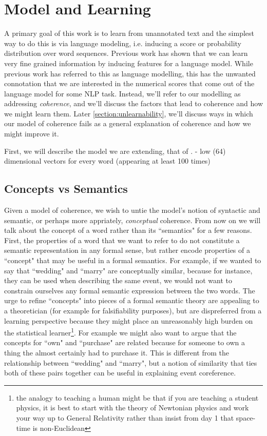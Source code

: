 \documentclass[11pt,letterpaper]{article}
\begin{document}
\section{Model and Learning} %
A primary goal of this work is to learn from unannotated text and
the simplest way to do this is via language modeling, i.e. inducing
a score or probability distribution over word sequences.
Previous work has shown that we can learn very fine grained information
by inducing features for a language model.
While previous work has referred to this as language modelling,
this has the unwanted connotation that we are interested in the
numerical scores that come out of the language model for some NLP task.
Instead, we'll refer to our modelling as addressing {\em coherence},
and we'll discuss the factors that lead to coherence and how we might learn them. 
Later \ref{section:unlearnability}, we'll discuss ways in which our model of coherence
fails as a general explanation of coherence and how we might improve it.

First, we will describe the model we are extending, that of \cite{rami}.
- low (64) dimensional vectors for every word (appearing at least 100 times)

\subsection{Concepts vs Semantics}
Given a model of coherence, we wish to untie the model's notion of syntactic
and semantic, or perhaps more appriately, {\em conceptual} coherence.
From now on we will talk about the concept of a word rather than its ``semantics"
for a few reasons. First, the properties of a word that we want to refer to do
not constitute a semantic representation in any formal sense, but rather encode
properties of a ``concept" that may be useful in a formal semantics.
For example, if we wanted to say that ``wedding" and ``marry" are conceptually
similar, because for instance, they can be used when describing the same event,
we would not want to constrain ourselves any formal semantic expression between
the two words. The urge to refine ``concepts" into pieces of a formal semantic theory
are appealing to a theoretician (for example for falsifiability purposes), but are
dispreferred from a learning perspective because they might place an unreasonably high
burden on the statistical learner\footnote{the analogy to teaching a human might be that
if you are teaching a student physics, it is best to start with the theory of
Newtonian physics and work your way up to General Relativity rather than insist from
day 1 that space-time is non-Euclidean}.
For example we might also want to argue that the concepts for ``own" and ``purchase"
are related because for someone to own a thing the almost certainly had to purchase it.
This is different from the relationship between ``wedding" and ``marry", but a notion
of similarity that ties both of these pairs together can be useful in explaining
event coreference.
\end{document}
